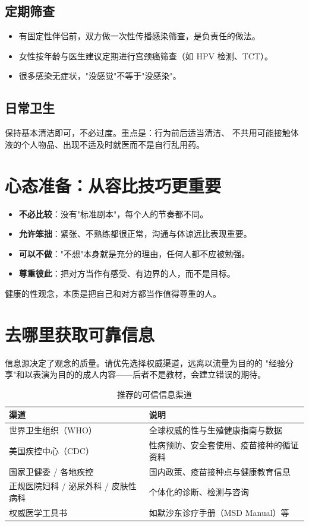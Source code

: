 \documentclass[12pt,UTF8,openany]{ctexbook}
\begin{document}
\section{定期筛查}

\begin{itemize}
  \item 有固定性伴侣前，双方做一次性传播感染筛查，是负责任的做法。
  \item 女性按年龄与医生建议定期进行宫颈癌筛查（如 HPV 检测、TCT）。
  \item 很多感染无症状，"没感觉"不等于"没感染"。
\end{itemize}

\section{日常卫生}

保持基本清洁即可，不必过度。重点是：行为前后适当清洁、
不共用可能接触体液的个人物品、出现不适及时就医而不是自行乱用药。

\chapter{心态准备：从容比技巧更重要}

\begin{itemize}
  \item \textbf{不必比较}：没有"标准剧本"，每个人的节奏都不同。
  \item \textbf{允许笨拙}：紧张、不熟练都很正常，沟通与体谅远比表现重要。
  \item \textbf{可以不做}："不想"本身就是充分的理由，任何人都不应被勉强。
  \item \textbf{尊重彼此}：把对方当作有感受、有边界的人，而不是目标。
\end{itemize}

健康的性观念，本质是把自己和对方都当作值得尊重的人。

\chapter{去哪里获取可靠信息}

信息源决定了观念的质量。请优先选择权威渠道，远离以流量为目的的
"经验分享"和以表演为目的的成人内容——后者不是教材，会建立错误的期待。

\begin{table}[htbp]
  \centering
  \caption{推荐的可信信息渠道}
  \begin{tabularx}{\textwidth}{@{}l X@{}}
    \toprule
    \textbf{渠道} & \textbf{说明} \\
    \midrule
    世界卫生组织（WHO）   & 全球权威的性与生殖健康指南与数据 \\
    美国疾控中心（CDC）   & 性病预防、安全套使用、疫苗接种的循证资料 \\
    国家卫健委 / 各地疾控 & 国内政策、疫苗接种点与健康教育信息 \\
    正规医院妇科 / 泌尿外科 / 皮肤性病科 & 个体化的诊断、检测与咨询 \\
    权威医学工具书         & 如默沙东诊疗手册（MSD Manual）等 \\
    \bottomrule
  \end{tabularx}
\end{table}
\end{document}
